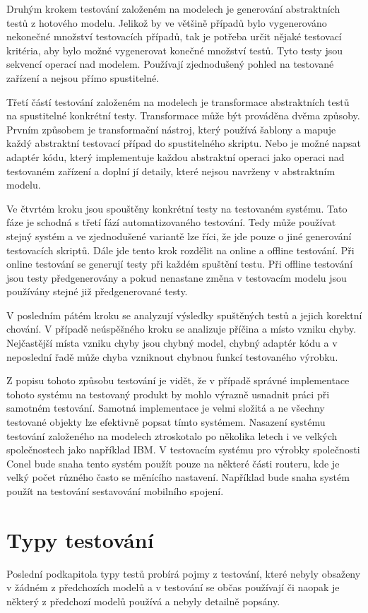 Druhým krokem testování založeném na modelech je generování abstraktních testů z hotového modelu. Jelikož by ve většině případů bylo vygenerováno nekonečné množství testovacích případů, tak je potřeba určit nějaké testovací kritéria, aby bylo možné vygenerovat konečné množství testů. Tyto testy jsou sekvencí operací nad modelem. Používají zjednodušený pohled na testované zařízení a nejsou přímo spustitelné.

Třetí částí testování založeném na modelech je transformace abstraktních testů na spustitelné konkrétní testy. Transformace může být prováděna dvěma způsoby. Prvním způsobem je transformační nástroj, který používá šablony a mapuje každý abstraktní testovací případ do spustitelného skriptu. Nebo je možné napsat adaptér kódu, který implementuje každou abstraktní operaci jako operaci nad testovaném zařízení a doplní jí detaily, které nejsou navrženy v abstraktním modelu.

Ve čtvrtém kroku jsou spouštěny konkrétní testy na testovaném systému. Tato fáze je schodná s třetí fází automatizovaného testování. Tedy může používat stejný systém a ve zjednodušené variantě lze říci, že jde pouze o jiné generování testovacích skriptů. Dále jde tento krok rozdělit na online a offline testování. Při online testování se generují testy při každém spuštění testu. Při offline testování jsou testy předgenerovány a pokud nenastane změna v testovacím modelu jsou používány stejné  již předgenerované testy.

V posledním pátém kroku se analyzují výsledky spuštěných testů a jejich korektní chování. V případě neúspěšného kroku se analizuje příčina a místo vzniku chyby. Nejčastější místa vzniku chyby jsou chybný model, chybný adaptér kódu a v neposlední řadě může chyba vzniknout chybnou funkcí testovaného výrobku.

Z popisu tohoto způsobu testování je vidět, že v případě správné implementace tohoto systému na testovaný produkt by mohlo výrazně usnadnit práci při samotném testování. Samotná implementace je velmi složitá a ne všechny testované objekty lze efektivně popsat tímto systémem. Nasazení systému testování založeného na modelech ztroskotalo po několika letech i ve velkých společnostech jako například IBM. V testovacím systému pro výrobky společnosti Conel bude snaha tento systém použít pouze na některé části routeru, kde je velký počet různého často se měnícího nastavení. Například bude snaha systém použít na testování sestavování mobilního spojení.

\section{Typy testování}
Poslední podkapitola typy testů probírá pojmy z testování, které nebyly obsaženy v žádném z předchozích modelů a v testování se občas používají či naopak je některý z předchozí modelů používá a nebyly detailně popsány.

